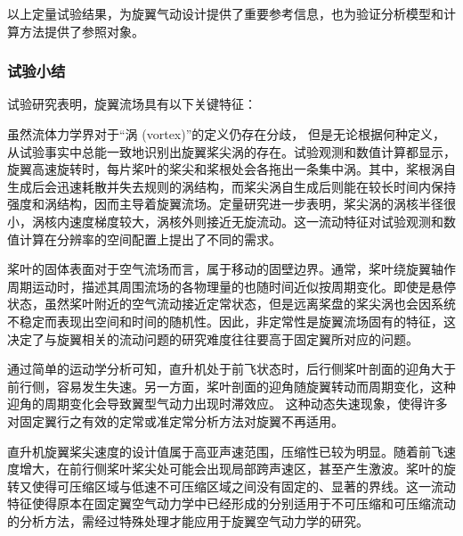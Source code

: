 以上定量试验结果，为旋翼气动设计提供了重要参考信息，也为验证分析模型和计算方法提供了参照对象。

\subsubsection{试验小结}

试验研究表明，旋翼流场具有以下关键特征： 
\begin{description}[wide]
\item [{桨尖涡主导}] 虽然流体力学界对于“涡 (vortex)”的定义仍存在分歧， 但是无论根据何种定义，从试验事实中总能一致地识别出旋翼桨尖涡的存在。试验观测和数值计算都显示，旋翼高速旋转时，每片桨叶的桨尖和桨根处会各拖出一条集中涡。其中，桨根涡自生成后会迅速耗散并失去规则的涡结构，而桨尖涡自生成后则能在较长时间内保持强度和涡结构，因而主导着旋翼流场。定量研究进一步表明，桨尖涡的涡核半径很小，涡核内速度梯度较大，涡核外则接近无旋流动。这一流动特征对试验观测和数值计算在分辨率的空间配置上提出了不同的需求。 
\item [{非定常}] 桨叶的固体表面对于空气流场而言，属于移动的固壁边界。通常，桨叶绕旋翼轴作周期运动时，描述其周围流场的各物理量的也随时间近似按周期变化。即使是悬停状态，虽然桨叶附近的空气流动接近定常状态，但是远离桨盘的桨尖涡也会因系统不稳定而表现出空间和时间的随机性。因此，非定常性是旋翼流场固有的特征，这决定了与旋翼相关的流动问题的研究难度往往要高于固定翼所对应的问题。 
\item [{动态失速}] 通过简单的运动学分析可知，直升机处于前飞状态时，后行侧桨叶剖面的迎角大于前行侧，容易发生失速。另一方面，桨叶剖面的迎角随旋翼转动而周期变化，这种迎角的周期变化会导致翼型气动力出现时滞效应。
这种动态失速现象，使得许多对固定翼行之有效的定常或准定常分析方法对旋翼不再适用。
\item [{局部可压缩}] 直升机旋翼桨尖速度的设计值属于高亚声速范围，压缩性已较为明显。随着前飞速度增大，在前行侧桨叶桨尖处可能会出现局部跨声速区，甚至产生激波。桨叶的旋转又使得可压缩区域与低速不可压缩区域之间没有固定的、显著的界线。这一流动特征使得原本在固定翼空气动力学中已经形成的分别适用于不可压缩和可压缩流动的分析方法，需经过特殊处理才能应用于旋翼空气动力学的研究。 
\end{description}

